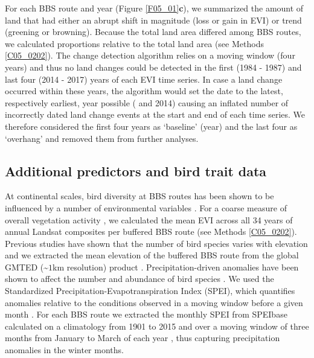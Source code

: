 For each BBS route and year (Figure \ref{F05_01}\textbf{c}), we summarized the amount of land that had either an abrupt shift in magnitude (loss or gain in EVI) or trend (greening or browning). Because the total land area differed among BBS routes, we calculated proportions relative to the total land area (see Methods \ref{C05_0202}). The change detection algorithm relies on a moving window (four years) and thus no land changes could be detected in the first (1984 - 1987) and last four (2014 - 2017) years of each EVI time series. In case a land change occurred within these years, the algorithm would set the date to the latest, respectively earliest, year possible ( and 2014) causing an inflated number of incorrectly dated land change events at the start and end of each time series. We therefore considered the first four years as ‘baseline’ (year) and the last four as ‘overhang’ and removed them from further analyses. 

\subsection{Additional predictors and bird trait data}
\label{C05_0204}

At continental scales, bird diversity at BBS routes has been shown to be influenced by a number of environmental variables \citep{Rowhani2008,Goetz2014,Hobi2017,Barnagaud2017}. For a coarse measure of overall vegetation activity \citep{Rowhani2008,Hobi2017}, we calculated the mean EVI across all 34 years of annual Landsat composites per buffered BBS route (see Methods \ref{C05_0202}). Previous studies have shown that the number of bird species varies with elevation \citep{Jarzyna2017} and we extracted the mean     elevation of the buffered BBS route from the global GMTED (\textasciitilde $1$km resolution) product \citep{Danielson2011}. Precipitation-driven anomalies have been shown to affect the number and abundance of bird species \citep{Barnagaud2017}. We used the Standardized Precipitation-Evapotranspiration Index (SPEI), which quantifies anomalies relative to the conditions observed in a moving window before a given month \citep{Vicente-Serrano2010,Vicente-Serrano2012}. For each BBS route we extracted the monthly SPEI from SPEIbase \citep[ver. 2.5, \href{http://spei.csic.es}{http://spei.csic.es}, ][]{Vicente-Serrano2010} calculated on a climatology from 1901 to 2015 and over a moving window of three   months from January to March of each year \citep{Vicente-Serrano2010}, thus capturing precipitation anomalies in the winter months.

